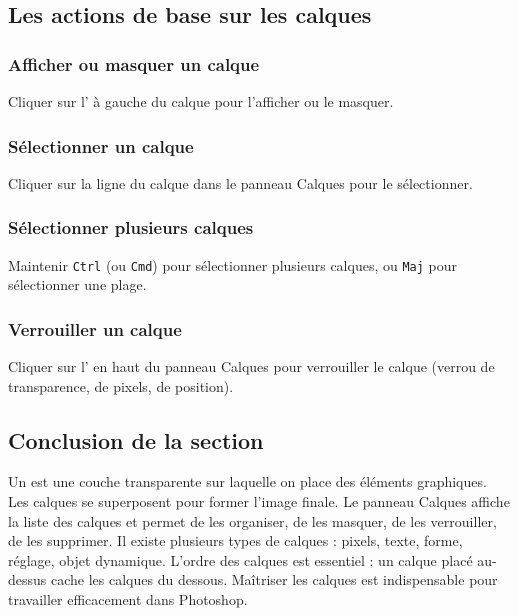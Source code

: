 \subsection{Les actions de base sur les calques}

\subsubsection{Afficher ou masquer un calque}

Cliquer sur l' à gauche du calque pour l'afficher ou le masquer.

\subsubsection{Sélectionner un calque}

Cliquer sur la ligne du calque dans le panneau Calques pour le sélectionner.

\subsubsection{Sélectionner plusieurs calques}

Maintenir \texttt{Ctrl} (ou \texttt{Cmd}) pour sélectionner plusieurs calques, ou \texttt{Maj} pour sélectionner une plage.

\subsubsection{Verrouiller un calque}

Cliquer sur l' en haut du panneau Calques pour verrouiller le calque (verrou de transparence, de pixels, de position).

\subsection*{Conclusion de la section}

Un  est une couche transparente sur laquelle on place des éléments graphiques. Les calques se superposent pour former l'image finale. Le panneau Calques affiche la liste des calques et permet de les organiser, de les masquer, de les verrouiller, de les supprimer. Il existe plusieurs types de calques : pixels, texte, forme, réglage, objet dynamique. L'ordre des calques est essentiel : un calque placé au-dessus cache les calques du dessous. Maîtriser les calques est indispensable pour travailler efficacement dans Photoshop.

